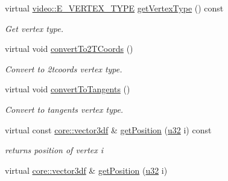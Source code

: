 \begin{DoxyCompactItemize}
virtual \hyperlink{namespaceirr_1_1video_a0e3b59e025e0d0db0ed2ee0ce904deac}{video\+::\+E\+\_\+\+V\+E\+R\+T\+E\+X\+\_\+\+T\+Y\+PE} \hyperlink{structirr_1_1scene_1_1SSkinMeshBuffer_a8a249cbb52eba63a694bff2e4a81667b}{get\+Vertex\+Type} () const
\begin{DoxyCompactList}\small\item\em Get vertex type. \end{DoxyCompactList}\item 
\mbox{\label{structirr_1_1scene_1_1SSkinMeshBuffer_a3e26fea48b32d6dbf85af8868e320e0b}} 
virtual void \hyperlink{structirr_1_1scene_1_1SSkinMeshBuffer_a3e26fea48b32d6dbf85af8868e320e0b}{convert\+To2\+T\+Coords} ()
\begin{DoxyCompactList}\small\item\em Convert to 2tcoords vertex type. \end{DoxyCompactList}\item 
\mbox{\label{structirr_1_1scene_1_1SSkinMeshBuffer_a9e88619ae71836ad081723498014eb2d}} 
virtual void \hyperlink{structirr_1_1scene_1_1SSkinMeshBuffer_a9e88619ae71836ad081723498014eb2d}{convert\+To\+Tangents} ()
\begin{DoxyCompactList}\small\item\em Convert to tangents vertex type. \end{DoxyCompactList}\item 
\mbox{\label{structirr_1_1scene_1_1SSkinMeshBuffer_ac7b1756763e68b0198bd9c76bbac9785}} 
virtual const \hyperlink{namespaceirr_1_1core_ae6e2b2a6c552833ebbd5b7463d03586b}{core\+::vector3df} \& \hyperlink{structirr_1_1scene_1_1SSkinMeshBuffer_ac7b1756763e68b0198bd9c76bbac9785}{get\+Position} (\hyperlink{namespaceirr_a0416a53257075833e7002efd0a18e804}{u32} i) const
\begin{DoxyCompactList}\small\item\em returns position of vertex i \end{DoxyCompactList}\item 
\mbox{\label{structirr_1_1scene_1_1SSkinMeshBuffer_a4d7588e1c5f393d9ad05a0e50c9f7b17}} 
virtual \hyperlink{namespaceirr_1_1core_ae6e2b2a6c552833ebbd5b7463d03586b}{core\+::vector3df} \& \hyperlink{structirr_1_1scene_1_1SSkinMeshBuffer_a4d7588e1c5f393d9ad05a0e50c9f7b17}{get\+Position} (\hyperlink{namespaceirr_a0416a53257075833e7002efd0a18e804}{u32} i)

\end{DoxyCompactItemize}

